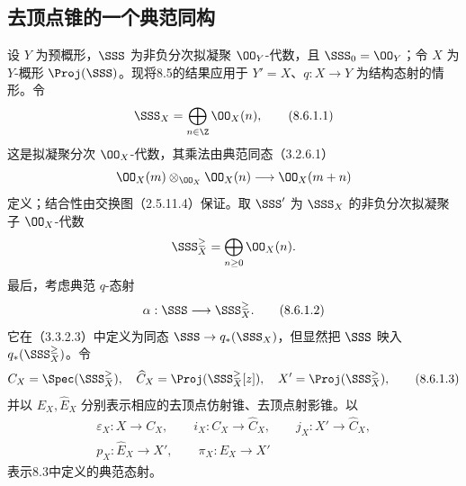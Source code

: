 \subsection{去顶点锥的一个典范同构}
设 $Y$ 为预概形，$\SSS$ 为非负分次拟凝聚 $\OO_Y$-代数，且 $\SSS_0=\OO_Y$；令 $X$ 为 $Y$-概形 $\Proj(\SSS)$。现将8.5的结果应用于 $Y'=X$、$q:X\to Y$ 为结构态射的情形。令
\begin{equation}
\SSS_X=\bigoplus_{n\in\Z}\OO_X(n),
\tag{8.6.1.1}
\end{equation}
这是拟凝聚分次 $\OO_X$-代数，其乘法由典范同态（3.2.6.1）
\[
\OO_X(m)\otimes_{\OO_X}\OO_X(n)\longrightarrow\OO_X(m+n)
\]
定义；结合性由交换图（2.5.11.4）保证。取 $\SSS'$ 为 $\SSS_X$ 的非负分次拟凝聚子 $\OO_X$-代数
\[
\SSS_X^{\geq}=\bigoplus_{n\geq0}\OO_X(n).
\]
最后，考虑典范 $q$-态射
\begin{equation}
\alpha:\SSS\longrightarrow\SSS_X^{\geq}.
\tag{8.6.1.2}
\end{equation}
它在（3.3.2.3）中定义为同态 $\SSS\to q_*(\SSS_X)$，但显然把 $\SSS$ 映入 $q_*(\SSS_X^{\geq})$。令
\begin{equation}
C_X=\Spec(\SSS_X^{\geq}),\quad
\widehat C_X=\Proj(\SSS_X^{\geq}[z]),\quad
X'=\Proj(\SSS_X^{\geq}),
\tag{8.6.1.3}
\end{equation}
并以 $E_X,\widehat E_X$ 分别表示相应的去顶点仿射锥、去顶点射影锥。以
\[
\begin{gathered}
\varepsilon_X:X\to C_X,\qquad i_X:C_X\to\widehat C_X,\qquad
j_X:X'\to\widehat C_X,\\
p_X:\widehat E_X\to X',\qquad \pi_X:E_X\to X'
\end{gathered}
\]
表示8.3中定义的典范态射。

